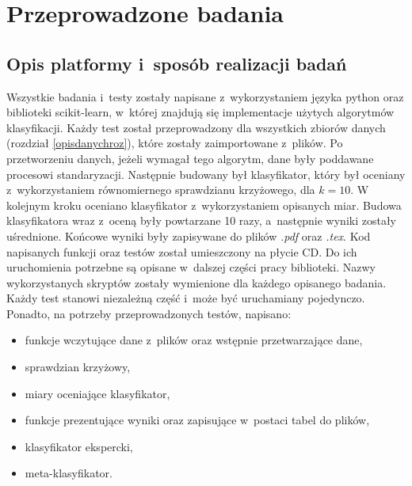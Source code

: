 \chapter{Przeprowadzone badania}

\section{Opis platformy i~sposób realizacji badań}
Wszystkie badania i~testy zostały napisane z~wykorzystaniem języka python oraz biblioteki scikit-learn, w~której znajdują się implementacje użytych algorytmów klasyfikacji. Każdy test został przeprowadzony dla wszystkich zbiorów danych (rozdział \ref{opisdanychroz}), które zostały zaimportowane z~plików. Po przetworzeniu danych, jeżeli wymagał tego algorytm, dane były poddawane procesowi standaryzacji. Następnie budowany był klasyfikator, który był oceniany z~wykorzystaniem równomiernego sprawdzianu krzyżowego, dla $k=10$. W kolejnym kroku oceniano klasyfikator z~wykorzystaniem opisanych miar. Budowa klasyfikatora wraz z~oceną były powtarzane 10 razy, a~następnie wyniki zostały uśrednione. Końcowe wyniki były zapisywane do plików \textit{.pdf} oraz \textit{.tex}. Kod napisanych funkcji oraz testów został umieszczony na płycie CD. Do ich uruchomienia potrzebne są opisane w~dalszej części pracy biblioteki. Nazwy wykorzystanych skryptów zostały wymienione dla każdego opisanego badania. Każdy test stanowi niezależną część i~może być uruchamiany pojedynczo. Ponadto, na potrzeby przeprowadzonych testów, napisano:
\begin{itemize}
	\item funkcje wczytujące dane z~plików oraz wstępnie przetwarzające dane,
	\item sprawdzian krzyżowy,
	\item miary oceniające klasyfikator,
	\item funkcje prezentujące wyniki oraz zapisujące w~postaci tabel do plików,
	\item klasyfikator ekspercki,
	\item meta-klasyfikator.
\end{itemize}

